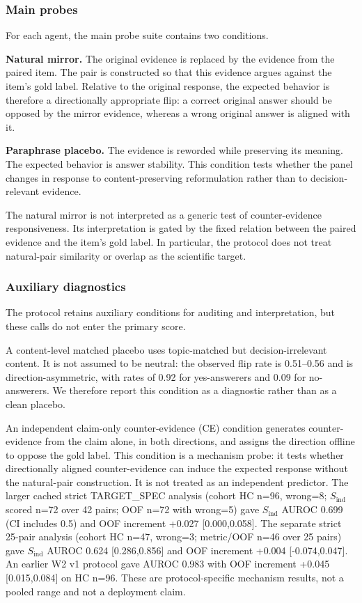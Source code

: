 \documentclass[11pt]{article}
\begin{document}
\subsubsection{Main probes}

For each agent, the main probe suite contains two conditions.

\textbf{Natural mirror.} The original evidence is replaced by the evidence from the paired item. The pair is constructed so that this evidence argues against the item's gold label. Relative to the original response, the expected behavior is therefore a directionally appropriate flip: a correct original answer should be opposed by the mirror evidence, whereas a wrong original answer is aligned with it.

\textbf{Paraphrase placebo.} The evidence is reworded while preserving its meaning. The expected behavior is answer stability. This condition tests whether the panel changes in response to content-preserving reformulation rather than to decision-relevant evidence.

The natural mirror is not interpreted as a generic test of counter-evidence responsiveness. Its interpretation is gated by the fixed relation between the paired evidence and the item's gold label. In particular, the protocol does not treat natural-pair similarity or overlap as the scientific target.

\subsubsection{Auxiliary diagnostics}

The protocol retains auxiliary conditions for auditing and interpretation, but these calls do not enter the primary score.

A content-level matched placebo uses topic-matched but decision-irrelevant content. It is not assumed to be neutral: the observed flip rate is 0.51--0.56 and is direction-asymmetric, with rates of 0.92 for yes-answerers and 0.09 for no-answerers. We therefore report this condition as a diagnostic rather than as a clean placebo.

An independent claim-only counter-evidence (CE) condition generates counter-evidence from the claim alone, in both directions, and assigns the direction offline to oppose the gold label. This condition is a mechanism probe: it tests whether directionally aligned counter-evidence can induce the expected response without the natural-pair construction. It is not treated as an independent predictor. The larger cached strict TARGET\_\allowbreak{}SPEC analysis (cohort HC n=96, wrong=8; \(S_{\mathrm{ind}}\) scored n=72 over 42 pairs; OOF n=72 with wrong=5) gave \(S_{\mathrm{ind}}\) AUROC 0.699 (CI includes 0.5) and OOF increment +0.027 [0.000,0.058]. The separate strict 25-pair analysis (cohort HC n=47, wrong=3; metric/OOF n=46 over 25 pairs) gave \(S_{\mathrm{ind}}\) AUROC 0.624 [0.286,0.856] and OOF increment +0.004 [-0.074,0.047]. An earlier W2 v1 protocol gave AUROC 0.983 with OOF increment +0.045 [0.015,0.084] on HC n=96. These are protocol-specific mechanism results, not a pooled range and not a deployment claim.
\end{document}
